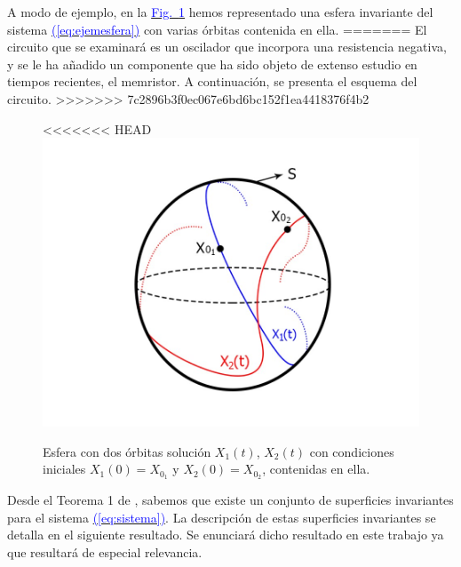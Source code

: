 \documentclass[12pt,a4paper]{report} %
\newcommand{\fref}[1]{\hyperref[#1]{\textcolor{blue}{Fig.~\ref*{#1}}}}
\newcommand{\eref}[1]{\hyperref[#1]{\textcolor{blue}{(\ref*{#1})}}}
\newcommand{\fref}[1]{\hyperref[#1]{\textcolor{blue}{\textit{Fig.~\ref*{#1}}}}}
\newcommand{\eref}[1]{\hyperref[#1]{\textcolor{blue}{\textit{(\ref*{#1})}}}}
\begin{document}
	\vspace{0.5cm}A modo de ejemplo, en la \fref{fig:esfera} hemos representado una esfera invariante del sistema \eref{eq:ejemesfera} con varias órbitas contenida en ella.
=======
	\noindent El circuito que se examinará es un oscilador que incorpora una resistencia negativa, y se le ha añadido un componente que ha sido objeto de extenso estudio en tiempos recientes, el memristor. A continuación, se presenta el esquema del circuito.
>>>>>>> 7c2896b3f0ec067e6bd6bc152f1ea4418376f4b2
	
	\vspace{0.5cm}\begin{figure}[h]
		\centering
<<<<<<< HEAD
		\includegraphics[width=1\textwidth]{esfera.jpg}
		\caption{Esfera con dos órbitas solución $X_1(t)$, $X_2(t)$ con condiciones iniciales $X_1(0)=X_{0_1}$ y $X_2(0)=X_{0_2}$, contenidas en ella.}
		\label{fig:esfera}
	\end{figure}\smallskip
	\newpage
	
	\vspace{0.5cm}Desde el Teorema 1 de \cite{ponce}, sabemos que existe un conjunto de superficies invariantes para el sistema \eref{eq:sistema}. La descripción de estas superficies invariantes se detalla en el siguiente resultado. Se enunciará dicho resultado en este trabajo ya que resultará de especial relevancia.
\end{document}
